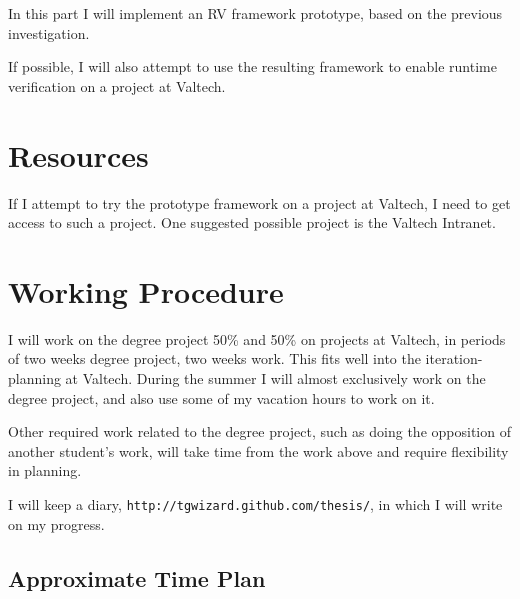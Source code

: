 \documentclass[a4paper,11pt]{article}
\begin{document}
In this part I will implement an RV framework prototype, based on the previous
investigation.

If possible, I will also attempt to use the resulting framework to enable runtime verification on a project at Valtech.


\section{Resources}

If I attempt to try the prototype framework on a project at Valtech, I need to get access to such a project. One suggested possible project is the Valtech Intranet.


\section{Working Procedure}

I will work on the degree project 50\% and 50\% on projects at Valtech, in periods of
two weeks degree project, two weeks work. This fits well into the iteration-planning at
Valtech. During the summer I will almost exclusively work on the degree project, and also
use some of my vacation hours to work on it.

Other required work related to the degree project, such as doing the opposition of
another student's work, will take time from the work above and require
flexibility in planning.

I will keep a diary, \texttt{http://tgwizard.github.com/thesis/}, in which I will write on my progress. 

\subsection{Approximate Time Plan}
\end{document}
